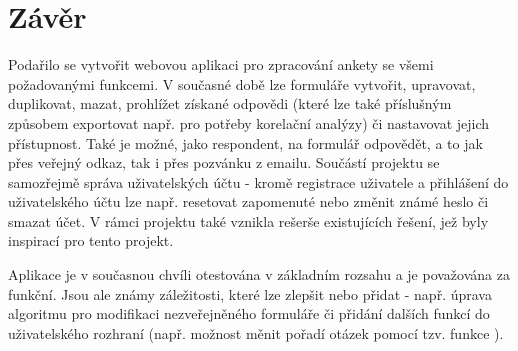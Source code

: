 \chapter{Závěr}
Podařilo se vytvořit webovou aplikaci pro zpracování ankety se všemi požadovanými funkcemi. V současné době lze formuláře vytvořit, upravovat, duplikovat, mazat, prohlížet získané odpovědi (které lze také příslušným způsobem exportovat např. pro potřeby korelační analýzy) či nastavovat jejich přístupnost. Také je možné, jako respondent, na formulář odpovědět, a to jak přes veřejný odkaz, tak i přes pozvánku z emailu. Součástí projektu se samozřejmě správa uživatelských účtu - kromě registrace uživatele a přihlášení do uživatelského účtu lze např. resetovat zapomenuté nebo změnit známé heslo či smazat účet. V rámci projektu také vznikla rešerše existujících řešení, jež byly inspirací pro tento projekt.

Aplikace je v současnou chvíli otestována v základním rozsahu a je považována za funkční. Jsou ale známy záležitosti, které lze zlepšit nebo přidat - např. úprava algoritmu pro modifikaci nezveřejněného formuláře či přidání dalších funkcí do uživatelského rozhraní (např. možnost měnit pořadí otázek pomocí tzv. funkce ).
